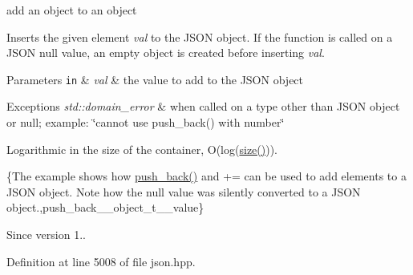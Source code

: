 add an object to an object 

Inserts the given element {\itshape val} to the J\+S\+O\+N object. If the function is called on a J\+S\+O\+N null value, an empty object is created before inserting {\itshape val}.


\begin{DoxyParams}[1]{Parameters}
\mbox{\tt in}  & {\em val} & the value to add to the J\+S\+O\+N object\\
\hline
\end{DoxyParams}

\begin{DoxyExceptions}{Exceptions}
{\em std\+::domain\+\_\+error} & when called on a type other than J\+S\+O\+N object or null; example\+: {\ttfamily \char`\"{}cannot use push\+\_\+back() with number\char`\"{}}\\
\hline
\end{DoxyExceptions}
Logarithmic in the size of the container, O(log({\ttfamily \hyperlink{classnlohmann_1_1basic__json_a01833b332b68d9af1f7cd7a816c39e49}{size()}})).

\{The example shows how {\ttfamily \hyperlink{classnlohmann_1_1basic__json_a486b96adbf4886c38e38c952394a220f}{push\+\_\+back()}} and {\ttfamily +=} can be used to add elements to a J\+S\+O\+N object. Note how the {\ttfamily null} value was silently converted to a J\+S\+O\+N object.,push\+\_\+back\+\_\+\+\_\+object\+\_\+t\+\_\+\+\_\+value\}

\begin{DoxySince}{Since}
version 1.. 
\end{DoxySince}


Definition at line 5008 of file json.\+hpp.

\hypertarget{classnlohmann_1_1basic__json_a9486a272e034c0548305d7a12f3045e6}{}
